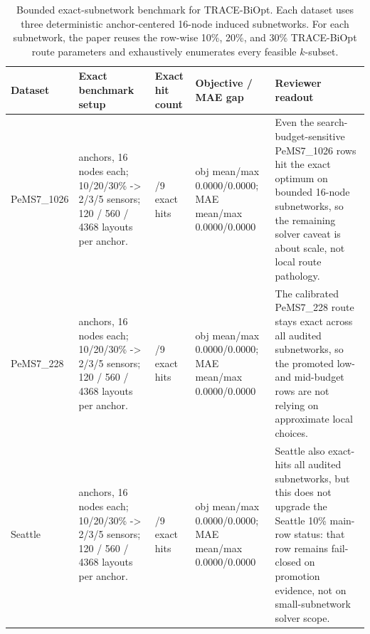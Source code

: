 \begin{table}[pos=htbp]
\centering
\caption{Bounded exact-subnetwork benchmark for TRACE-BiOpt. Each dataset uses three deterministic anchor-centered 16-node induced subnetworks. For each subnetwork, the paper reuses the row-wise 10\%, 20\%, and 30\% TRACE-BiOpt route parameters and exhaustively enumerates every feasible $k$-subset.}
\label{tab:trace-biopt-exact-subnetwork}
\scriptsize
\setlength{\tabcolsep}{4pt}
\begin{tabularx}{\textwidth}{>{\raggedright\arraybackslash}p{}>{\raggedright\arraybackslash}p{}>{\raggedright\arraybackslash}p{}>{\raggedright\arraybackslash}p{}>{\raggedright\arraybackslash}X}
\toprule
Dataset & Exact benchmark setup & Exact hit count & Objective / MAE gap & Reviewer readout \\
\midrule
PeMS7\_1026 & 3 anchors, 16 nodes each; 10/20/30\% -> 2/3/5 sensors; 120 / 560 / 4368 layouts per anchor. & 9/9 exact hits & obj mean/max 0.0000/0.0000; MAE mean/max 0.0000/0.0000 & Even the search-budget-sensitive PeMS7\_1026 rows hit the exact optimum on bounded 16-node subnetworks, so the remaining solver caveat is about scale, not local route pathology. \\
PeMS7\_228 & 3 anchors, 16 nodes each; 10/20/30\% -> 2/3/5 sensors; 120 / 560 / 4368 layouts per anchor. & 9/9 exact hits & obj mean/max 0.0000/0.0000; MAE mean/max 0.0000/0.0000 & The calibrated PeMS7\_228 route stays exact across all audited subnetworks, so the promoted low- and mid-budget rows are not relying on approximate local choices. \\
Seattle & 3 anchors, 16 nodes each; 10/20/30\% -> 2/3/5 sensors; 120 / 560 / 4368 layouts per anchor. & 9/9 exact hits & obj mean/max 0.0000/0.0000; MAE mean/max 0.0000/0.0000 & Seattle also exact-hits all audited subnetworks, but this does not upgrade the Seattle 10\% main-row status: that row remains fail-closed on promotion evidence, not on small-subnetwork solver scope. \\
\bottomrule
\end{tabularx}
\end{table}
